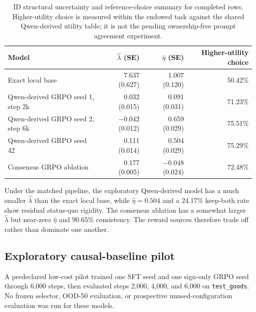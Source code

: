 \documentclass[11pt,letterpaper]{article}
\begin{document}
\begin{table}[htbp]
\centering
\small
\begin{tabular}{lrrr}
\toprule
Model & $\widehat\lambda$ (SE) & $\widehat\eta$ (SE) & Higher-utility choice \\
\midrule
Exact local base & 7.637 (0.627) & 1.007 (0.120) & 50.42\% \\
Qwen-derived GRPO seed 1, step 2k & 0.032 (0.015) & 0.091 (0.031) & 71.23\% \\
Qwen-derived GRPO seed 2, step 6k & $-0.042$ (0.012) & 0.659 (0.029) & 75.51\% \\
Qwen-derived GRPO seed 42 & 0.111 (0.014) & 0.504 (0.029) & 75.29\% \\
Consensus GRPO ablation & 0.177 (0.005) & $-0.048$ (0.024) & 72.48\% \\
\bottomrule
\end{tabular}
\caption{ID structural uncertainty and reference-choice summary for completed
rows. Higher-utility choice is measured within the endowed task against the
shared Qwen-derived utility table; it is not the pending ownership-free prompt
agreement experiment.}
\label{tab:id-se-rational}
\end{table}

Under the matched pipeline, the exploratory Qwen-derived model has a much
smaller $\widehat\lambda$ than the exact local base, while
$\widehat\eta=0.504$ and a 24.17\% keep-both rate show residual status-quo
rigidity. The consensus ablation has a somewhat larger $\widehat\lambda$ but
near-zero $\widehat\eta$ and 90.65\% consistency. The reward sources therefore
trade off rather than dominate one another.

\subsection{Exploratory causal-baseline pilot}

A predeclared low-cost pilot trained one SFT seed and one sign-only GRPO seed
through 6,000 steps, then evaluated steps 2,000, 4,000, and 6,000 on
\texttt{test\_goods}. No frozen selector, OOD-50 evaluation, or prospective
unused-configuration evaluation was run for these models.
\end{document}
